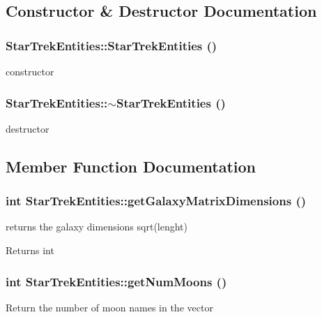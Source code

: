 \subsection{Constructor \& Destructor Documentation}
\hypertarget{classStarTrekEntities_a4a3c862c9806b9e83320b081e0616c6c}{
\subsubsection[{StarTrekEntities}]{\setlength{\rightskip}{0pt plus 5cm}StarTrekEntities::StarTrekEntities ()}}
\label{d0/ddd/classStarTrekEntities_a4a3c862c9806b9e83320b081e0616c6c}
constructor \hypertarget{classStarTrekEntities_aa4d1ff02e0102df2b73fc738fc90dab6}{
\subsubsection[{$\sim$StarTrekEntities}]{\setlength{\rightskip}{0pt plus 5cm}StarTrekEntities::$\sim$StarTrekEntities ()}}
\label{d0/ddd/classStarTrekEntities_aa4d1ff02e0102df2b73fc738fc90dab6}
destructor 

\subsection{Member Function Documentation}
\hypertarget{classStarTrekEntities_aed82ad39e2c5376ff8c0b5ced385c664}{
\subsubsection[{getGalaxyMatrixDimensions}]{\setlength{\rightskip}{0pt plus 5cm}int StarTrekEntities::getGalaxyMatrixDimensions ()}}
\label{d0/ddd/classStarTrekEntities_aed82ad39e2c5376ff8c0b5ced385c664}
returns the galaxy dimensions sqrt(lenght)

\begin{DoxyReturn}{Returns}
int 
\end{DoxyReturn}
\hypertarget{classStarTrekEntities_ae468b9e190fc493ad359eb9617c36b3d}{
\subsubsection[{getNumMoons}]{\setlength{\rightskip}{0pt plus 5cm}int StarTrekEntities::getNumMoons ()}}
\label{d0/ddd/classStarTrekEntities_ae468b9e190fc493ad359eb9617c36b3d}
Return the number of moon names in the vector


